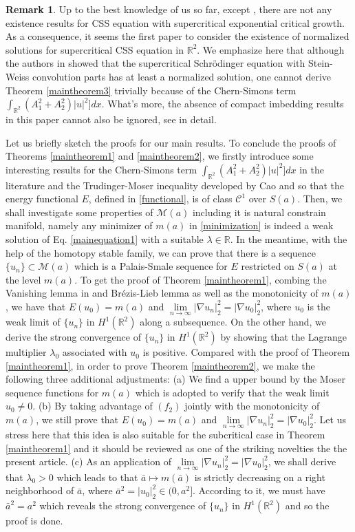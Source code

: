 \documentclass[11pt]{amsart}
\numberwithin{equation}{section}
\theoremstyle{definition}
\newtheorem{remark}[theorem]{Remark}
\newcommand{\R}{\mathbb{R}}
\begin{document}
\begin{remark}
Up to the best knowledge of us so far, except \cite{Shen2},
there are not any existence results
for CSS equation with supercritical exponential critical growth.
As a consequence, it seems the first paper to consider the existence of normalized solutions for
supercritical CSS equation in $\R^2$. We emphasize here that although the authors in \cite{AS}
showed that the supercritical Schr\"{o}dinger equation with Stein-Weiss convolution parts
has at least a normalized solution,
one cannot derive Theorem \ref{maintheorem3} trivially
because of the Chern-Simons term $\int_{\R^2} (A_1^2+A_2^2)|u|^2]dx$.
What's more, the absence of compact imbedding results in this paper cannot also be ignored,
see \cite[Lemma 2.3]{AS} in detail.
\end{remark}

Let us briefly  sketch the proofs for our main results.
To conclude the proofs of Theorems \ref{maintheorem1} and \ref{maintheorem2},
we firstly introduce some interesting results for the Chern-Simons term $\int_{\R^2} (A_1^2+A_2^2)|u|^2]dx$ in the literature
and the Trudinger-Moser inequality developed by Cao \cite{Cao}
and so that the energy functional $E$, defined in \eqref{functional},
is of class $\mathcal{C}^1$ over $S(a)$. Then, we shall
investigate some properties of $\mathcal{M}(a)$
including it is natural constrain manifold, namely any minimizer of $m(a)$ in \eqref{minimization}
is indeed a weak solution of Eq. \eqref{mainequation1} with a suitable $\lambda\in\R$.
In the meantime, with the help of the homotopy stable family,
we can prove that there is a sequence $\{u_n\}\subset \mathcal{M}(a)$
which is a Palais-Smale sequence for $E$ restricted on $S(a)$ at the level $m(a)$.
To get the proof of Theorem \ref{maintheorem1},
combing the Vanishing lemma in \cite{Willem}
and Br\'{e}zis-Lieb lemma as well as the monotonicity of $m(a)$, we have that $E(u_0)=m(a)$
and $\lim\limits_{n\to\infty}|\nabla u_n|_2^2=|\nabla u_0|_2^2$,
where $u_0$ is the weak limit of $\{u_n\}$ in $H^1(\R^2)$
along a subsequence. On the other hand, we derive the strong convergence of
 $\{u_n\}$ in $H^1(\R^2)$ by showing that the Lagrange multiplier $\lambda_0$
associated with $u_0$ is positive. Compared with the proof of Theorem \ref{maintheorem1}, in order
to prove Theorem \ref{maintheorem2}, we make the following three additional adjustments:
(a) We find a upper bound by the Moser sequence functions for $m(a)$ which is adopted to verify that the weak limit $u_0\neq0$.
(b) By taking advantage of $(f_2)$ jointly with the monotonicity of $m(a)$, we still prove that $E(u_0)=m(a)$
and $\lim\limits_{n\to\infty}|\nabla u_n|_2^2=|\nabla u_0|_2^2$. Let us stress here that this idea is also suitable for the
subcritical case in Theorem \ref{maintheorem1} and it should be reviewed as one of the striking novelties
the the present article. (c) As an application of $\lim\limits_{n\to\infty}|\nabla u_n|_2^2=|\nabla u_0|_2^2$,
we shall derive that $\lambda_0>0$ which leads to that $\bar{a}\mapsto m(\bar{a})$  is strictly decreasing
on a right neighborhood of $\bar{a}$, where $\bar{a}^2=|u_0|_2^2\in(0,a^2]$.
According to it, we must have $\bar{a}^2=a^2$ which reveals the strong convergence of $\{u_n\}$ in $H^1(\R^2)$
and so the proof is done.
\end{document}
